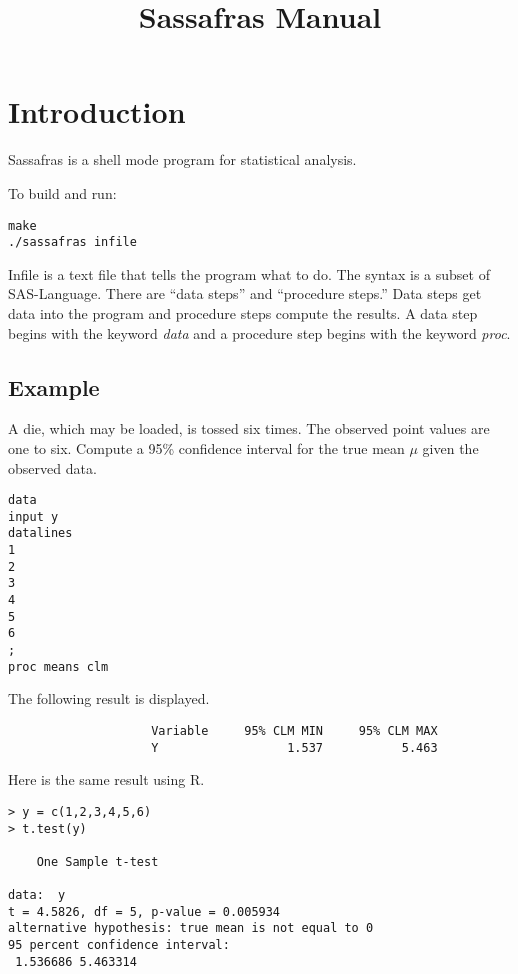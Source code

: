 \documentclass[12pt]{article}
\title{Sassafras Manual}
\author{}
\date{}
\begin{document}
\maketitle

\tableofcontents

\newpage

\section{Introduction}
Sassafras is a shell mode program for statistical analysis.

\noindent
To build and run:

\begin{Verbatim}
make
./sassafras infile
\end{Verbatim}

Infile is a text file that tells the program what to do.
The syntax is a subset of SAS-Language.
There are ``data steps'' and ``procedure steps.''
Data steps get data into the program and procedure steps
compute the results.
A data step begins with the keyword {\it data}
and a procedure step begins with the keyword {\it proc}.

\subsection*{Example}
A die, which may be loaded, is tossed six times.
The observed point values are one to six.
Compute a 95\% confidence interval for the true mean $\mu$
given the observed data.

\begin{Verbatim}
data
input y
datalines
1
2
3
4
5
6
;
proc means clm
\end{Verbatim}

The following result is displayed.

\begin{Verbatim}
                    Variable     95% CLM MIN     95% CLM MAX
                    Y                  1.537           5.463
\end{Verbatim}

Here is the same result using R.

\begin{Verbatim}
> y = c(1,2,3,4,5,6)
> t.test(y)

	One Sample t-test

data:  y
t = 4.5826, df = 5, p-value = 0.005934
alternative hypothesis: true mean is not equal to 0
95 percent confidence interval:
 1.536686 5.463314
\end{Verbatim}
\end{document}
